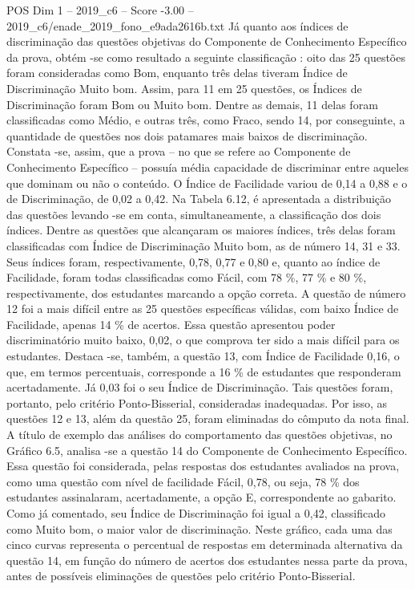 \begin{textsample}{POS Dim 1 – 2019\_c6 – Score -3.00 – 2019\_c6/enade\_2019\_fono\_e9ada2616b.txt}
Já quanto aos índices de discriminação das questões objetivas do Componente de Conhecimento Específico da prova, obtém -se como resultado a seguinte classificação : oito das 25 questões foram consideradas como Bom, enquanto três delas tiveram Índice de Discriminação Muito bom.
Assim, para 11 em 25 questões, os Índices de Discriminação foram Bom ou Muito bom.
Dentre as demais, 11 delas foram classificadas como Médio, e outras três, como Fraco, sendo 14, por conseguinte, a quantidade de questões nos dois patamares mais baixos de discriminação.
Constata -se, assim, que a prova – no que se refere ao Componente de Conhecimento Específico – possuía média capacidade de discriminar entre aqueles que dominam ou não o conteúdo.
O Índice de Facilidade variou de 0,14 a 0,88 e o de Discriminação, de 0,02 a 0,42.
Na Tabela 6.12, é apresentada a distribuição das questões levando -se em conta, simultaneamente, a classificação dos dois índices.
Dentre as questões que alcançaram os maiores índices, três delas foram classificadas com Índice de Discriminação Muito bom, as de número 14, 31 e 33.
Seus índices foram, respectivamente, 0,78, 0,77 e 0,80 e, quanto ao índice de Facilidade, foram todas classificadas como Fácil, com 78 \%, 77 \% e 80 \%, respectivamente, dos estudantes marcando a opção correta.
A questão de número 12 foi a mais difícil entre as 25 questões específicas válidas, com baixo Índice de Facilidade, apenas 14 \% de acertos.
Essa questão apresentou poder discriminatório muito baixo, 0,02, o que comprova ter sido a mais difícil para os estudantes.
Destaca -se, também, a questão 13, com Índice de Facilidade 0,16, o que, em termos percentuais, corresponde a 16 \% de estudantes que responderam acertadamente.
Já 0,03 foi o seu Índice de Discriminação.
Tais questões foram, portanto, pelo critério Ponto-Bisserial, consideradas inadequadas.
Por isso, as questões 12 e 13, além da questão 25, foram eliminadas do cômputo da nota final.
A título de exemplo das análises do comportamento das questões objetivas, no Gráfico 6.5, analisa -se a questão 14 do Componente de Conhecimento Específico.
Essa questão foi considerada, pelas respostas dos estudantes avaliados na prova, como uma questão com nível de facilidade Fácil, 0,78, ou seja, 78 \% dos estudantes assinalaram, acertadamente, a opção E, correspondente ao gabarito.
Como já comentado, seu Índice de Discriminação foi igual a 0,42, classificado como Muito bom, o maior valor de discriminação.
Neste gráfico, cada uma das cinco curvas representa o percentual de respostas em determinada alternativa da questão 14, em função do número de acertos dos estudantes nessa parte da prova, antes de possíveis eliminações de questões pelo critério Ponto-Bisserial.

\end{textsample}
